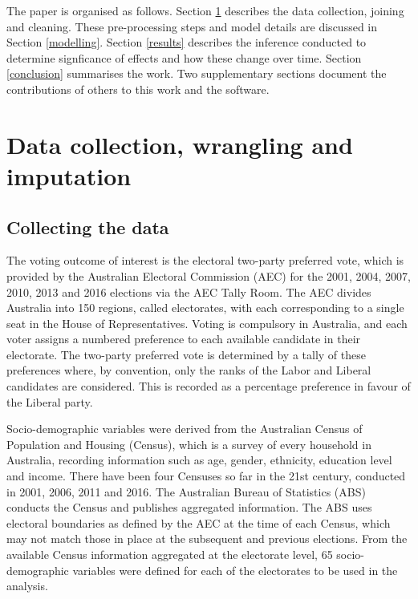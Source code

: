 \documentclass[times, doublespace]{anzsauth}
\begin{document}
The paper is organised as follows. Section \ref{data} describes the data collection, joining and cleaning. These pre-processing steps and model details are discussed in Section \ref{modelling}. Section \ref{results} describes the inference conducted to determine signficance of effects and how these change over time. Section \ref{conclusion} summarises the work. Two supplementary sections document the contributions of others to this work and the software.

\hypertarget{data}{%
\section{Data collection, wrangling and imputation}\label{data}}

\hypertarget{collecting-the-data}{%
\subsection{Collecting the data}\label{collecting-the-data}}

The voting outcome of interest is the electoral two-party preferred vote, which is provided by the Australian Electoral Commission (AEC) for the 2001, 2004, 2007, 2010, 2013 and 2016 elections via the AEC Tally Room. The AEC divides Australia into 150 regions, called electorates, with each corresponding to a single seat in the House of Representatives. Voting is compulsory in Australia, and each voter assigns a numbered preference to each available candidate in their electorate. The two-party preferred vote is determined by a tally of these preferences where, by convention, only the ranks of the Labor and Liberal candidates are considered. This is recorded as a percentage preference in favour of the Liberal party.

Socio-demographic variables were derived from the Australian Census of Population and Housing (Census), which is a survey of every household in Australia, recording information such as age, gender, ethnicity, education level and income. There have been four Censuses so far in the 21st century, conducted in 2001, 2006, 2011 and 2016. The Australian Bureau of Statistics (ABS) conducts the Census and publishes aggregated information. The ABS uses electoral boundaries as defined by the AEC at the time of each Census, which may not match those in place at the subsequent and previous elections. From the available Census information aggregated at the electorate level, 65 socio-demographic variables were defined for each of the electorates to be used in the analysis.
\end{document}
